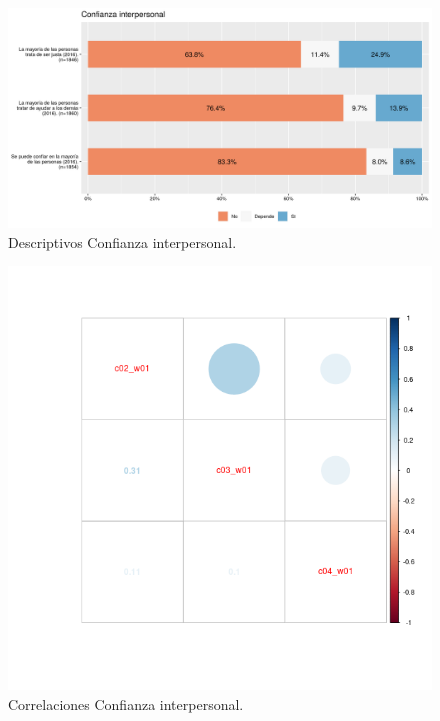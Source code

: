\documentclass[
  12pt,
]{book}
\begin{document}
\begin{figure}[H]

{\centering \includegraphics[width=1\linewidth,height=1\textheight]{output/graphs/confianza-interpersonal} 

}

\caption{Descriptivos Confianza interpersonal.}\label{fig:confianza-interpersonal}
\end{figure}

\begin{figure}[H]

{\centering \includegraphics[width=1\linewidth,height=1\textheight]{output/graphs/confianza-interpersonal_cor} 

}

\caption{Correlaciones Confianza interpersonal.}\label{fig:confianza-interpersonal-cor}
\end{figure}
\end{document}
